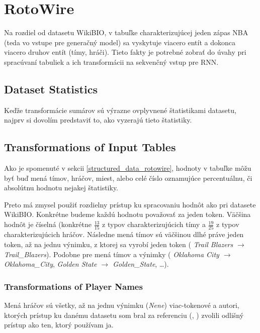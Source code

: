 \section{RotoWire}

Na rozdiel od datasetu WikiBIO, v tabuľke charakterizujúcej jeden zápas NBA (teda vo vstupe pre generačný model) sa vyskytuje viacero entít a dokonca viacero druhov entít (tímy, hráči). Tieto fakty je potrebné zobrať do úvahy pri spracúvaní tabuliek a ich transformácii na sekvenčný vstup pre RNN.

\subsection{Dataset Statistics}

Keďže transformácie sumárov sú výrazne ovplyvnené štatistikami datasetu, najprv si dovolím predstaviť to, ako vyzerajú tieto štatistiky. 

\subsection{Transformations of Input Tables}

Ako je spomenuté v sekcii \ref{structured_data_rotowire}, hodnoty v tabuľke môžu byť buď mená tímov, hráčov, miest, alebo celé číslo oznamujúce percentuálnu, či absolútnu hodnotu nejakej štatistiky.

Preto má zmysel použiť rozdielny prístup ku spracovaniu hodnôt ako pri datasete WikiBIO. Konkrétne budeme každú hodnotu považovať za jeden token. Väčšina hodnôt je číselná (konkrétne $\frac{13}{15}$ z typov charakterizujúcich tímy a $\frac{19}{25}$ z typov charakterizujúcich hráčov. Následne mená tímov sú väčšinou dlhé práve jeden token, až na jednu výnimku, z ktorej sa vyrobí jeden token ( \emph{Trail Blazers $\rightarrow$ Trail\_Blazers}). Podobne pre mená tímov a výnimky ( \emph{Oklahoma City $\rightarrow$ Oklahoma\_City}, \emph{Golden State $\rightarrow$ Golden\_State}, \dots).

\subsubsection{Transformations of Player Names} \label{trans_p_nms}

Mená hráčov sú všetky, až na jednu výnimku (\emph{Nene}) viac-tokenové a autori, ktorých prístup ku danému datasetu som bral za referenciu (\citep{wiseman2017}, \citep{puduppully2019datatotext}) zvolili odlišný prístup ako ten, ktorý používam ja.


